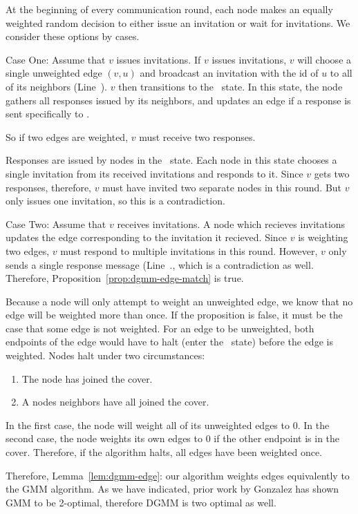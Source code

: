 \begin{IEEEproof}
\begin{IEEEproof}
At the beginning of every communication round, each node makes an equally weighted random decision to either issue an invitation or wait for invitations. We consider these options by cases.

    Case One: Assume that $v$ issues invitations. If $v$ issues invitations, $v$ will choose a single unweighted edge $(v,u)$ and broadcast an invitation with the id of $u$ to all of its neighbors (Line~). $v$ then transitions to the \cWd\ state. In this state, the node gathers all responses issued by its neighbors, and updates an edge if a response is sent specifically to .

    So if two edges are weighted, $v$ must receive two responses.

    Responses are issued by nodes in the \cRd\ state. Each node in this state chooses a single invitation from its received invitations and responds to it. Since $v$ gets two responses, therefore, $v$ must have invited two separate nodes in this round. But $v$ only issues one invitation, so this is a contradiction.

    Case Two: Assume that $v$ receives invitations. A node which recieves invitations updates the edge corresponding to the invitation it recieved. Since $v$ is weighting two edges, $v$ must respond to multiple invitations in this round. However, $v$ only sends a single response message (Line~., which is a contradiction as well.
    Therefore, Proposition~\ref{prop:dgmm-edge-match} is true.
  \end{IEEEproof}
  \begin{IEEEproof}
    Because a node will only attempt to weight an unweighted edge, we know that no edge will be weighted more than once. If the proposition is false, it must be the case that some edge is not weighted.
    For an edge to be unweighted, both endpoints of the edge would have to halt (enter the \cDd\ state) before the edge is weighted. Nodes halt under two circumstances:
    \begin{enumerate}
    \item The node has joined the cover.
    \item A nodes neighbors have all joined the cover.
    \end{enumerate}
    In the first case, the node will weight all of its unweighted edges to 0. In the second case, the node weights its own edges to 0 if the other endpoint is in the cover.
    Therefore, if the algorithm halts, all edges have been weighted once.
  \end{IEEEproof}
  Therefore, Lemma~\ref{lem:dgmm-edge}: our algorithm weights edges equivalently to the GMM algorithm. As we have indicated, prior work by Gonzalez has shown GMM to be 2-optimal, therefore DGMM is two optimal as well.
\end{IEEEproof}
